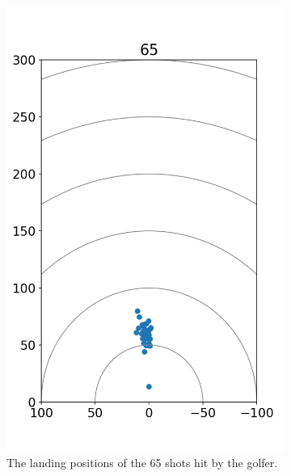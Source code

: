 \documentclass{kththesis}
\begin{document}
\begin{figure}
    \centering
    \begin{subfigure}{0.4\textwidth}
    \centering
    \includegraphics[height=0.4\textheight]{Shots/65_shots.png} 
    \caption{The landing positions of the 65 shots hit by the golfer.}
    \label{fig:65_shots}
    \end{subfigure}
    \begin{subfigure}{0.4\textwidth}
    \centering

\end{subfigure}
\end{figure}
\end{document}
